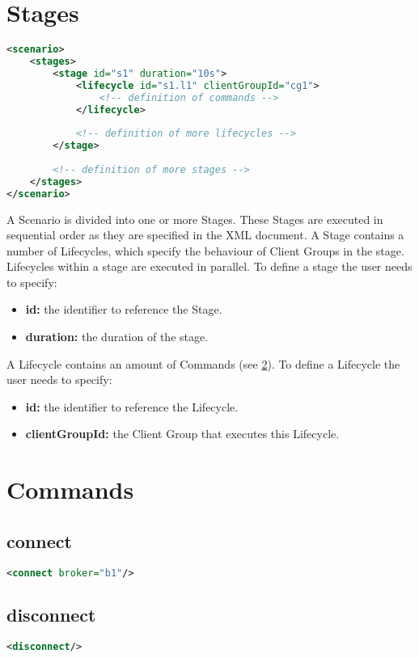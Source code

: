 \section{Stages}
\begin{lstlisting}[caption={XMl definition of Stages}, captionpos=b, label={lst:stages}, language=XML]
<scenario>
	<stages>
		<stage id="s1" duration="10s">
			<lifecycle id="s1.l1" clientGroupId="cg1">
				<!-- definition of commands -->
			</lifecycle>
	
			<!-- definition of more lifecycles -->
		</stage>
	
		<!-- definition of more stages -->
	</stages>
</scenario>
\end{lstlisting}
A Scenario is divided into one or more Stages.
These Stages are executed in sequential order as they are specified in the XML document.
A Stage contains a number of Lifecycles, which specify the behaviour of Client Groups in the stage.
Lifecycles within a stage are executed in parallel.
To define a stage the user needs to specify:
\begin{itemize}
	\item \textbf{id:} the identifier to reference the Stage.
	\item \textbf{duration:} the duration of the stage. %
\end{itemize}
A Lifecycle contains an amount of Commands (see \ref{sec:commands}). To define a Lifecycle the user needs to specify:
\begin{itemize}
	\item \textbf{id:} the identifier to reference the Lifecycle.
	\item \textbf{clientGroupId:} the Client Group that executes this Lifecycle.
\end{itemize}

\section{Commands}\label{sec:commands}
\subsection{connect}
\begin{lstlisting}[caption={XMl definition of a connect command}, captionpos=b, label={lst:connect}, language=XML]
<connect broker="b1"/>
\end{lstlisting}
\subsection{disconnect}
\begin{lstlisting}[caption={XMl definition of a disconnect command}, captionpos=b, label={lst:disconnect}, language=XML]
<disconnect/>
\end{lstlisting}
